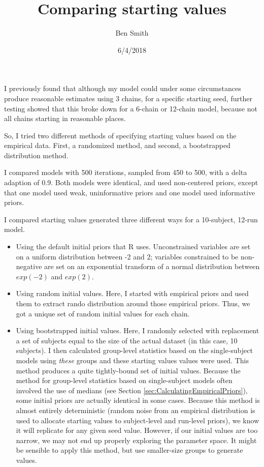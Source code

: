 \documentclass[]{article}
\title{Comparing starting values}
\author{Ben Smith}
\date{6/4/2018}
\providecommand{\tightlist}{%
  \setlength{\itemsep}{0pt}\setlength{\parskip}{0pt}}
\begin{document}
\maketitle

I previously found that although my model could under some circumstances
produce reasonable estimates using 3 chains, for a specific starting
seed, further testing showed that this broke down for a 6-chain or
12-chain model, because not all chains starting in reasonable places.

So, I tried two different methods of specifying starting values based on
the empirical data. First, a randomized method, and second, a
bootstrapped distribution method.

I compared models with 500 iterations, sampled from 450 to 500, with a
delta adaption of 0.9. Both models were identical, and used non-centered
priors, except that one model used weak, uninformative priors and one
model used informative priors.

I compared starting values generated three different ways for a
10-subject, 12-run model.

\begin{itemize}
\tightlist
\item
  Using the default initial priors that R uses. Unconstrained variables
  are set on a uniform distribution between -2 and 2; variables
  constrained to be non-negative are set on an exponential transform of
  a normal distribution between \(exp(-2)\) and \(exp(2)\).
\item
  Using random initial values. Here, I started with empirical priors and
  used them to extract rando distribution around those empirical priors.
  Thus, we got a unique set of random initial values for each chain.
\item
  Using bootstrapped initial values. Here, I randomly selected with
  replacement a set of subjects equal to the size of the actual dataset
  (in this case, 10 subjects). I then calculated group-level statistics
  based on the single-subject models using \emph{these} groups and these
  starting values values were used. This method produces a quite
  tightly-bound set of initial values. Because the method for
  group-level statistics based on single-subject models often involved
  the use of medians (see Section \ref{sec:CalculatingEmpiricalPriors}),
  some initial priors are actually identical in some cases. Because this
  method is almost entirely deterministic (random noise from an
  empirical distribution is used to allocate starting values to
  subject-level and run-level priors), we know it will replicate for any
  given seed value. However, if our initial values are too narrow, we
  may not end up properly exploring the parameter space. It might be
  sensible to apply this method, but use smaller-size groups to generate
  values.
\end{itemize}
\end{document}

